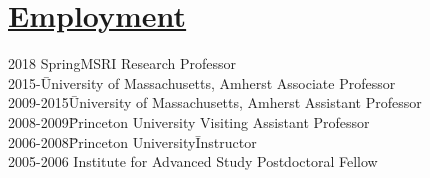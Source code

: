 \documentclass[11pt]{amsart}
\theoremstyle{plain}
\theoremstyle{definition}
\theoremstyle{remark}
\begin{document}
\section*{\Large\underline{Employment}}

\begin{tabbing}
2018 Spring\quad\quad  MSRI \quad\quad\quad\quad\quad\quad\quad\quad\quad\quad\quad\quad\quad\quad\quad\quad\quad Research Professor\\
2015-\quad\quad\quad\quad\;\;\;\= University of Massachusetts, Amherst\quad\quad\;\;\; Associate Professor\\
2009-2015\quad\quad\;\;\;\= University of Massachusetts, Amherst\quad\quad\;\;\; Assistant Professor\\
2008-2009\quad\quad\;\;\;\= Princeton University\quad\quad\quad\quad\quad\quad\quad
\quad\quad\quad\;\; Visiting Assistant
Professor\\
 2006-2008\quad\quad\;\;\:\=        Princeton
University\quad\quad\quad\quad\quad\quad\quad\quad\quad\quad\quad\=
Instructor\\
2005-2006 \>Institute for Advanced Study\> Postdoctoral Fellow
\end{tabbing}









\end{document}
